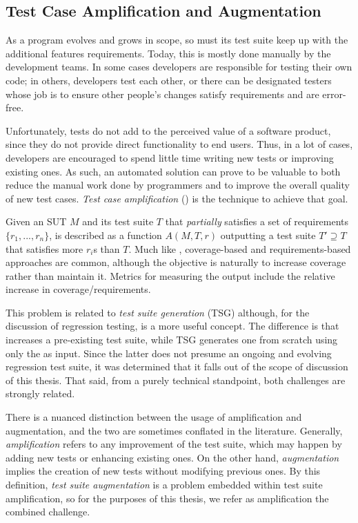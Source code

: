 \subsection{Test Case Amplification and Augmentation}
\label{sec:tsa}

As a program evolves and grows in scope, so must its test suite keep up with the additional features requirements.
Today, this is mostly done manually by the development teams.
In some cases developers are responsible for testing their own code; in others, developers test each other, or there can be designated testers whose job is to ensure other people's changes satisfy requirements and are error-free.

Unfortunately, tests do not add to the perceived value of a software product, since they do not provide direct functionality to end users.
Thus, in a lot of cases, developers are encouraged to spend little time writing new tests or improving existing ones.
As such, an automated solution can prove to be valuable to both reduce the manual work done by programmers and to improve the overall quality of new test cases.
\textit{Test case amplification} (\tsa) is the technique to achieve that goal.

Given an SUT $M$ and its test suite $T$ that \textit{partially} satisfies a set of requirements $\{r_1, ..., r_n\}$, \tsa is described as a function $A(M, T, r)$ outputting a test suite $T' \supseteq T$ that satisfies more $r_i$s than $T$.
Much like \tsr, coverage-based and requirements-based approaches are common, although the objective is naturally to increase coverage rather than maintain it.
Metrics for measuring the output include the relative increase in coverage/requirements.

This problem is related to \textit{test suite generation} (TSG) although, for the discussion of regression testing, \tsa is a more useful concept.
The difference is that \tsa increases a pre-existing test suite, while TSG generates one from scratch using only the \sut as input.
Since the latter does not presume an ongoing and evolving regression test suite, it was determined that it falls out of the scope of discussion of this thesis.
That said, from a purely technical standpoint, both challenges are strongly related.

There is a nuanced distinction between the usage of amplification and augmentation, and the two are sometimes conflated in the literature.
Generally, \textit{amplification} refers to any improvement of the test suite, which may happen by adding new tests or enhancing existing ones.
On the other hand, \textit{augmentation} implies the creation of new tests without modifying previous ones.
By this definition, \textit{test suite augmentation} is a problem embedded within test suite amplification, so for the purposes of this thesis, we refer as amplification the combined challenge.
